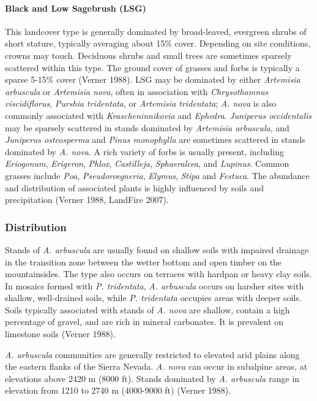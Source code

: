 \paragraph{Black and Low Sagebrush (LSG)}	This landcover type is generally dominated by broad-leaved, evergreen shrubs of short stature, typically averaging about 15\% cover. Depending on site conditions, crowns may touch. Deciduous shrubs and small trees are sometimes sparsely scattered within this type. The ground cover of grasses and forbs is typically a sparse 5-15\% cover (Verner 1988). LSG may be dominated by either \emph{Artemisia arbuscula} or \emph{Artemisia nova}, often in association with \emph{Chrysothamnus viscidiflorus}, \emph{Purshia tridentata}, or \emph{Artemisia tridentata}; \emph{A. nova} is also commonly associated with \emph{Krascheninnikovia} and \emph{Ephedra}. \emph{Juniperus occidentalis} may be sparsely scattered in stands dominated by \emph{Artemisia arbuscula}, and \emph{Juniperus osteosperma} and \emph{Pinus monophylla} are sometimes scattered in stands dominated by \emph{A. nova}. A rich variety of forbs is usually present, including \emph{Eriogonum}, \emph{Erigeron}, \emph{Phlox}, \emph{Castilleja}, \emph{Sphaeralcea}, and \emph{Lupinus}. Common grasses include \emph{Poa}, \emph{Pseudoroegneria}, \emph{Elymus}, \emph{Stipa} and \emph{Festuca}. The abundance and distribution of associated plants is highly influenced by soils and precipitation (Verner 1988, LandFire 2007).

\subsubsection{Distribution}
Stands of \emph{A. arbuscula} are usually found on shallow soils with impaired drainage in the transition zone between the wetter bottom and open timber on the mountainsides. The type also occurs on terraces with hardpan or heavy clay soils. In mosaics formed with \emph{P. tridentata}, \emph{A. arbuscula} occurs on harsher sites with shallow, well-drained soils, while \emph{P. tridentata} occupies areas with deeper soils. Soils typically associated with stands of \emph{A. nova} are shallow, contain a high percentage of gravel, and are rich in mineral carbonates. It is prevalent on limestone soils (Verner 1988).

\emph{A. arbuscula} communities are generally restricted to elevated arid plains along the eastern flanks of the Sierra Nevada. \emph{A. nova} can occur in subalpine areas, at elevations above 2420 m (8000 ft). Stands dominated by \emph{A. arbuscula} range in elevation from 1210 to 2740 m (4000-9000 ft) (Verner 1988).


